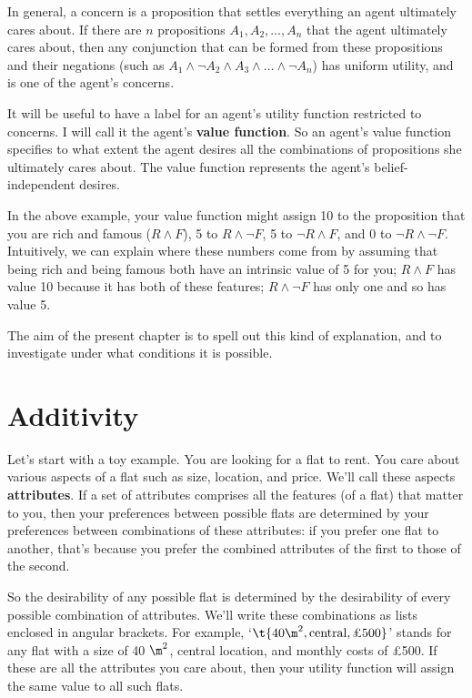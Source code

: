 In general, a concern is a proposition that settles everything an agent
ultimately cares about. If there are $n$ propositions $A_1,A_2,\ldots,A_n$ that the
agent ultimately cares about, then any conjunction that can be formed from these
propositions and their negations (such as
$A_1 \land \neg A_2 \land A_3 \land \ldots \land \neg A_n$) has uniform utility,
and is one of the agent's concerns.

It will be useful to have a label for an agent's utility function restricted to
concerns. I will call it the agent's \textbf{value function}. So an agent's
value function specifies to what extent the agent desires all the combinations
of propositions she ultimately cares about. The value function represents the
agent's belief-independent desires.

In the above example, your value function might assign 10 to the proposition
that you are rich and famous ($R \land F$), 5 to $R \land \neg F$, 5 to
$\neg R \land F$, and 0 to $\neg R \land \neg F$. Intuitively, we can explain
where these numbers come from by assuming that being rich and being famous both
have an intrinsic value of 5 for you; $R \land F$ has value 10 because it has
both of these features; $R \land \neg F$ has only one and so has value 5.

The aim of the present chapter is to spell out this kind of explanation, and
to investigate under what conditions it is possible.

\section{Additivity}\label{sec:additivity}

Let's start with a toy example. You are looking for a flat to rent.
You care about various aspects of a flat such as size, location, and
price. We'll call these aspects \textbf{attributes}. If a set of
attributes comprises all the features (of a flat) that matter to you,
then your preferences between possible flats are determined by your
preferences between combinations of these attributes: if you prefer
one flat to another, that's because you prefer the combined attributes
of the first to those of the second.

So the desirability of any possible flat is determined by the
desirability of every possible combination of attributes. We'll write
these combinations as lists enclosed in angular brackets. For example,
`$\t{40 \m^2, \text{central}, \text{£500}}$' stands for any flat with
a size of 40 $\m^2$, central location, and monthly costs of £500. If
these are all the attributes you care about, then your utility
function will assign the same value to all such flats.

